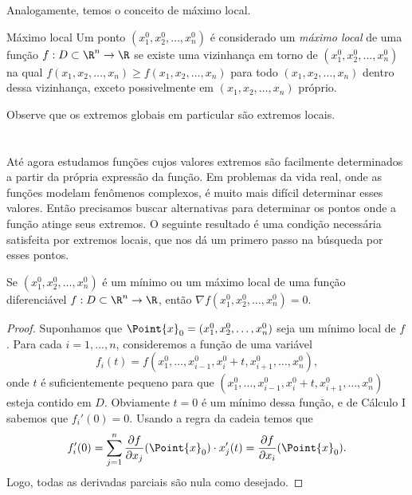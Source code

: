 Analogamente, temos o conceito de máximo local. 
\begin{definition}{Máximo local}{}
Um ponto \((x_1^0, x_2^0, \ldots, x_n^0)\) é considerado um \textit{máximo local} de uma função \(f:D\subset\R^n\to\R\) se existe uma vizinhança em torno de \((x_1^0, x_2^0, \ldots, x_n^0)\) na qual \(f(x_1, x_2, \ldots, x_n)\geq f(x_1, x_2, \ldots, x_n)\) para todo $(x_1, x_2, \ldots, x_n)$ dentro dessa vizinhança, exceto possivelmente em \((x_1, x_2, \ldots, x_n)\) próprio.     
\end{definition}

Observe que os extremos globais em particular são extremos locais. 

\section{}
Até agora estudamos funções cujos valores extremos são facilmente determinados a partir da própria expressão da função. Em problemas da vida real, onde as funções modelam fenômenos complexos, é muito mais difícil determinar esses valores. Então precisamos buscar alternativas para determinar os pontos onde a função atinge seus extremos. O seguinte resultado é uma condição necessária satisfeita por extremos locais, que nos dá um primero passo na búsqueda por esses pontos. 
\begin{theorem}{}{}
    Se \((x_1^0, x_2^0, \ldots, x_n^0)\) é um {mínimo ou um máximo  local} de uma função diferenciável \(f:D\subset\R^n\to\R\), então $\nabla f(x_1^0, x_2^0, \ldots, x_n^0)=0$. 
\end{theorem}
\begin{proof}
Suponhamos que $\Point{x}_0=(x_1^0, x_2^0, \ldots, x_n^0)$ seja um mínimo local de $f$. Para cada $i=1,...,n$, consideremos a função de uma variável $$f_i(t)=f(x_1^0,\dots,x_{i-1}^0,x_i^0+t,x_{i+1}^0,\dots,x_n^0),$$ onde $t$ é suficientemente pequeno para que $(x_1^0,\dots,x_{i-1}^0,x_i^0+t,x_{i+1}^0,\dots,x_n^0)$ esteja contido em $D$. Obviamente $t=0$ é um mínimo dessa função, e de Cálculo I sabemos que $f_i'(0)=0$. Usando a regra da cadeia temos que 
$$f_i'(0) = \sum_{j=1}^n\dfrac{\partial f}{\partial x_j}(\Point{x}_0) \cdot x_j'(t) = \dfrac{\partial f}{\partial x_i}(\Point{x}_0). $$
Logo, todas as derivadas parciais são nula como desejado. 
\end{proof}




